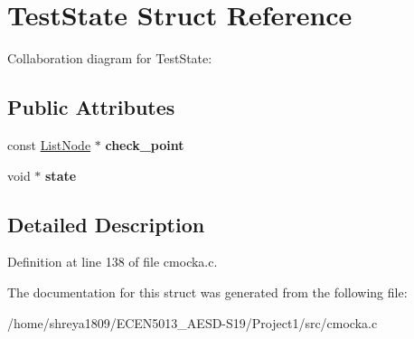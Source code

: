 \hypertarget{structTestState}{}\section{Test\+State Struct Reference}
\label{structTestState}


Collaboration diagram for Test\+State\+:
\subsection*{Public Attributes}
\begin{DoxyCompactItemize}
\item 
\mbox{\label{structTestState_a2c788f0404f8d97501b5cad7af459b5f}} 
const \hyperlink{structListNode}{List\+Node} $\ast$ {\bfseries check\+\_\+point}
\item 
\mbox{\label{structTestState_a7a40669131980ba9c632c6f9fa98f6a9}} 
void $\ast$ {\bfseries state}
\end{DoxyCompactItemize}


\subsection{Detailed Description}


Definition at line 138 of file cmocka.\+c.



The documentation for this struct was generated from the following file\+:\begin{DoxyCompactItemize}
\item 
/home/shreya1809/\+E\+C\+E\+N5013\+\_\+\+A\+E\+S\+D-\/\+S19/\+Project1/src/cmocka.\+c\end{DoxyCompactItemize}
